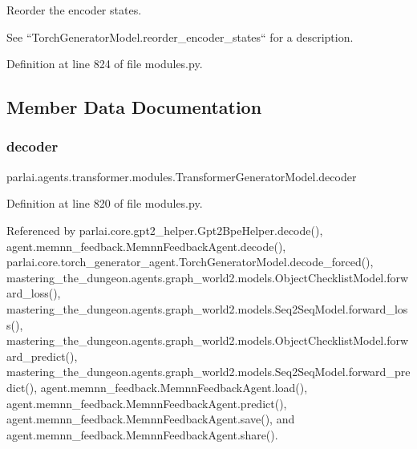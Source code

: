 \begin{DoxyVerb}Reorder the encoder states.

See ``TorchGeneratorModel.reorder_encoder_states`` for a description.
\end{DoxyVerb}
 

Definition at line 824 of file modules.\+py.



\subsection{Member Data Documentation}
\mbox{\label{classparlai_1_1agents_1_1transformer_1_1modules_1_1TransformerGeneratorModel_a6467f0fdec226329cb8efe77245996a5}} 
\subsubsection{\texorpdfstring{decoder}{decoder}}
{\footnotesize\ttfamily parlai.\+agents.\+transformer.\+modules.\+Transformer\+Generator\+Model.\+decoder}



Definition at line 820 of file modules.\+py.



Referenced by parlai.\+core.\+gpt2\+\_\+helper.\+Gpt2\+Bpe\+Helper.\+decode(), agent.\+memnn\+\_\+feedback.\+Memnn\+Feedback\+Agent.\+decode(), parlai.\+core.\+torch\+\_\+generator\+\_\+agent.\+Torch\+Generator\+Model.\+decode\+\_\+forced(), mastering\+\_\+the\+\_\+dungeon.\+agents.\+graph\+\_\+world2.\+models.\+Object\+Checklist\+Model.\+forward\+\_\+loss(), mastering\+\_\+the\+\_\+dungeon.\+agents.\+graph\+\_\+world2.\+models.\+Seq2\+Seq\+Model.\+forward\+\_\+loss(), mastering\+\_\+the\+\_\+dungeon.\+agents.\+graph\+\_\+world2.\+models.\+Object\+Checklist\+Model.\+forward\+\_\+predict(), mastering\+\_\+the\+\_\+dungeon.\+agents.\+graph\+\_\+world2.\+models.\+Seq2\+Seq\+Model.\+forward\+\_\+predict(), agent.\+memnn\+\_\+feedback.\+Memnn\+Feedback\+Agent.\+load(), agent.\+memnn\+\_\+feedback.\+Memnn\+Feedback\+Agent.\+predict(), agent.\+memnn\+\_\+feedback.\+Memnn\+Feedback\+Agent.\+save(), and agent.\+memnn\+\_\+feedback.\+Memnn\+Feedback\+Agent.\+share().

